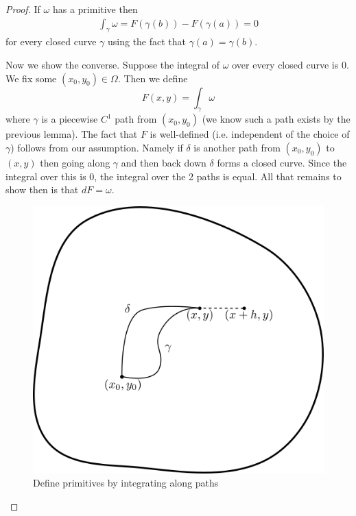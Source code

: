 \begin{proof}
    If $\omega$ has a primitive then
    \begin{align*}
        \displaystyle \int_{\gamma}\omega = F(\gamma(b)) - F(\gamma(a)) = 0
    \end{align*}
    for every closed curve $\gamma$ using the fact that $\gamma(a) = \gamma(b)$.
    
    Now we show the converse. Suppose the integral of $\omega$ over every closed curve is 0. We fix some $(x_0, y_0) \in \Omega$. Then we define
    $$ F(x, y) = \int_{\gamma} \omega $$
    where $\gamma$ is a piecewise $C^1$ path from $(x_0, y_0)$ (we know such a path exists by the previous lemma). The fact that $F$ is well-defined (i.e. independent of the choice of $\gamma$) follows from our assumption. Namely if $\delta$ is another path from $(x_0, y_0)$ to $(x, y)$ then going along $\gamma$ and then back down $\delta$ forms a closed curve. Since the integral over this is 0, the integral over the 2 paths is equal. All that remains to show then is that $dF = \omega$.

    \begin{figure}
        \centering
        \includegraphics[scale=0.9]{Images/primitive_existence.png}
        \caption{Define primitives by integrating along paths}
        \label{fig:primitive-existence}
    \end{figure}    
    

\end{proof}

